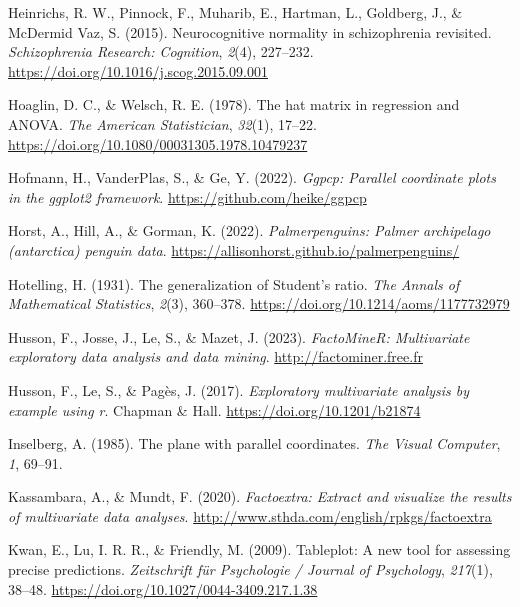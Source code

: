 \documentclass[
  letterpaper,
  10pt,
  krantz2]{krantz}
\newlength{\cslhangindent}
\newlength{\cslentryspacingunit} %
\newenvironment{CSLReferences}[2] %
 {%
  \setlength{\parindent}{0pt}
  \ifodd #1
  \let\oldpar\par
  \def\par{\hangindent=\cslhangindent\oldpar}
  \fi
  \setlength{\parskip}{#2\cslentryspacingunit}
 }%
 {}
\begin{document}
\begin{CSLReferences}{1}{0}
\leavevmode{}%
Heinrichs, R. W., Pinnock, F., Muharib, E., Hartman, L., Goldberg, J.,
\& McDermid Vaz, S. (2015). Neurocognitive normality in schizophrenia
revisited. \emph{Schizophrenia Research: Cognition}, \emph{2}(4),
227--232. \url{https://doi.org/10.1016/j.scog.2015.09.001}

\leavevmode{}%
Hoaglin, D. C., \& Welsch, R. E. (1978). The hat matrix in regression
and {ANOVA}. \emph{The American Statistician}, \emph{32}(1), 17--22.
\url{https://doi.org/10.1080/00031305.1978.10479237}

\leavevmode{}%
Hofmann, H., VanderPlas, S., \& Ge, Y. (2022). \emph{Ggpcp: Parallel
coordinate plots in the ggplot2 framework}.
\url{https://github.com/heike/ggpcp}

\leavevmode{}%
Horst, A., Hill, A., \& Gorman, K. (2022). \emph{Palmerpenguins: Palmer
archipelago (antarctica) penguin data}.
\url{https://allisonhorst.github.io/palmerpenguins/}

\leavevmode{}%
Hotelling, H. (1931). The generalization of {Student's} ratio. \emph{The
Annals of Mathematical Statistics}, \emph{2}(3), 360--378.
\url{https://doi.org/10.1214/aoms/1177732979}

\leavevmode{}%
Husson, F., Josse, J., Le, S., \& Mazet, J. (2023). \emph{FactoMineR:
Multivariate exploratory data analysis and data mining}.
\url{http://factominer.free.fr}

\leavevmode{}%
Husson, F., Le, S., \& Pagès, J. (2017). \emph{Exploratory multivariate
analysis by example using r}. Chapman \& Hall.
\url{https://doi.org/10.1201/b21874}

\leavevmode{}%
Inselberg, A. (1985). The plane with parallel coordinates. \emph{The
Visual Computer}, \emph{1}, 69--91.

\leavevmode{}%
Kassambara, A., \& Mundt, F. (2020). \emph{Factoextra: Extract and
visualize the results of multivariate data analyses}.
\url{http://www.sthda.com/english/rpkgs/factoextra}

\leavevmode{}%
Kwan, E., Lu, I. R. R., \& Friendly, M. (2009). Tableplot: A new tool
for assessing precise predictions. \emph{Zeitschrift f{ü}r Psychologie /
Journal of Psychology}, \emph{217}(1), 38--48.
\url{https://doi.org/10.1027/0044-3409.217.1.38}


\end{CSLReferences}
\end{document}
